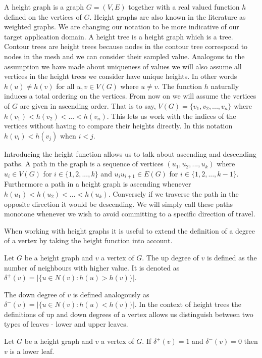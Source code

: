 

A height graph is a graph $G = (V, E)$ together with a real valued function $h$ defined on the vertices of $G$. Height graphs are also known in the literature as weighted graphs. We are changing our notation to be more indicative of our target application domain. A height tree is a height graph which is a tree. Contour trees are height trees because nodes in the contour tree correspond to nodes in the mesh and we can consider their sampled value. Analogous to the assumption we have made about uniqueness of values we will also assume all vertices in the height trees we consider have unique heights. In other words $h(u) \ne h(v)$ for all $u ,v \in V(G)$ where $u \ne v$. The function $h$ naturally induces a total ordering on the vertices. From now on we will assume the vertices of $G$ are given in ascending order. That is to say, $V(G) = \{v_1, v_2, ... , v_n\}$ where $h(v_1) < h(v_2) < ... < h(v_n)$. This lets us work with the indices of the vertices without having to compare their heights directly. In this notation $h(v_i) < h(v_j)$ when $i < j$.


Introducing the height function allows us to talk about ascending and descending paths. A path in the graph is a sequence of vertices $(u_1, u_2, ... , u_k)$ where $u_i \in V(G)$ for $i \in \{1, 2, ..., k\}$ and $u_iu_{i+1} \in E(G)$ for $i \in \{1, 2, ..., k-1\}$. Furthermore a path in a height graph is ascending whenever $h(u_1) < h(u_2) < ... < h(u_k)$. Conversely if we traverse the path in the opposite direction it would be descending. We will simply call these paths monotone whenever we wish to avoid committing to a specific direction of travel.

When working with height graphs it is useful to extend the definition of a degree of a vertex by taking the height function into account.

\begin{defn} Let $G$ be a height graph and $v$ a vertex of $G$. The up degree of $v$ is defined as the number of neighbours with higher value. It is denoted as $\delta^+(v) = \big|\{ u \in N(v) : h(u) > h(v) \}\big|$.   \end{defn}

The down degree of $v$ is defined analogously as $\delta^-(v) = \big|\{ u \in N(v) : h(u) < h(v) \}\big|$. In the context of height trees the definitions of up and down degrees of a vertex allows us distinguish between two types of leaves - lower and upper leaves.  
\begin{defn} Let $G$ be a height graph and $v$ a vertex of $G$. If  $\delta^+(v) = 1$ and $\delta^-(v) = 0$ then $v$ is a lower leaf.  \end{defn}

